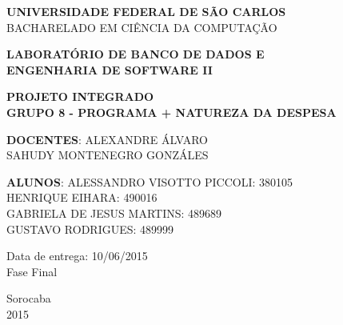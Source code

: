 \begin{titlepage}
\begin{center}
{\bf \large UNIVERSIDADE FEDERAL DE SÃO CARLOS}\\[0.2cm]
{\large BACHARELADO EM CIÊNCIA DA COMPUTAÇÃO}\\[0.2cm]

\end{center}

\vfill
\begin{center}
{\bf \large LABORATÓRIO DE BANCO DE DADOS E\\ENGENHARIA DE SOFTWARE II}\\[3.2cm]
\end{center}

\begin{center}
{\bf \LARGE PROJETO INTEGRADO}\\[0.3cm]
{\bf \Large GRUPO 8 - PROGRAMA + NATUREZA DA DESPESA}\\[2.2cm]
\end{center}

\vfill
\begin{flushright}
{\large \textbf{DOCENTES}: ALEXANDRE ÁLVARO}\\[0.2cm]
{\large SAHUDY MONTENEGRO GONZÁLES}\\[0.5cm]
\end{flushright}

\vfill
\begin{flushright}
{\large {\bf ALUNOS}: ALESSANDRO VISOTTO PICCOLI: 380105}\\[0.15cm]
{\large HENRIQUE EIHARA: 490016}\\[0.15cm]
{\large GABRIELA DE JESUS MARTINS: 489689}\\[0.15cm]
{\large GUSTAVO RODRIGUES: 489999}\\[0.15cm]
\end{flushright}

\vfill
\begin{flushright}
{\large Data de entrega: 10/06/2015}\\[0.2cm]
{\large Fase Final}\\[2.0cm]
\end{flushright}

\begin{center}
{\large Sorocaba}\\[0.2cm]
{\large 2015}
\end{center}

\end{titlepage}
